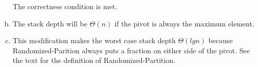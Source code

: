 \documentclass[12pt]{article}
\begin{document}
\begin{enumerate}[(a)]
The correctness condition is met.

\smallskip
\item The stack depth will be $ \Theta(n) $ if the pivot is always the maximum element.

\smallskip
\item
\begin{algorithm}[H]
  \SetAlgoLined
\end{algorithm}
This modification makes the worst case stack depth $ \Theta(lg n) $ because Randomized-Parition always puts a fraction on either side of the pivot. See the text for the definition of Randomized-Partition.
\end{enumerate}   
\end{document}
